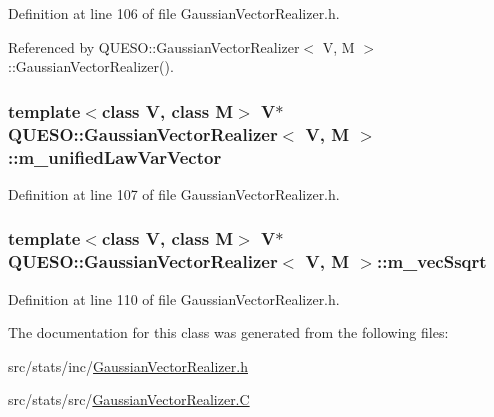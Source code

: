 Definition at line 106 of file Gaussian\-Vector\-Realizer.\-h.



Referenced by Q\-U\-E\-S\-O\-::\-Gaussian\-Vector\-Realizer$<$ V, M $>$\-::\-Gaussian\-Vector\-Realizer().

\hypertarget{class_q_u_e_s_o_1_1_gaussian_vector_realizer_a80276355d3e24953ed7be0749a554d85}{
\subsubsection[{m\-\_\-unified\-Law\-Var\-Vector}]{\setlength{\rightskip}{0pt plus 5cm}template$<$class V, class M$>$ V$\ast$ {\bf Q\-U\-E\-S\-O\-::\-Gaussian\-Vector\-Realizer}$<$ V, M $>$\-::m\-\_\-unified\-Law\-Var\-Vector\hspace{0.3cm}{\ttfamily [private]}}}\label{class_q_u_e_s_o_1_1_gaussian_vector_realizer_a80276355d3e24953ed7be0749a554d85}


Definition at line 107 of file Gaussian\-Vector\-Realizer.\-h.

\hypertarget{class_q_u_e_s_o_1_1_gaussian_vector_realizer_a473a7c1e61dd0b311bb7da6c244cb53d}{
\subsubsection[{m\-\_\-vec\-Ssqrt}]{\setlength{\rightskip}{0pt plus 5cm}template$<$class V, class M$>$ V$\ast$ {\bf Q\-U\-E\-S\-O\-::\-Gaussian\-Vector\-Realizer}$<$ V, M $>$\-::m\-\_\-vec\-Ssqrt\hspace{0.3cm}{\ttfamily [private]}}}\label{class_q_u_e_s_o_1_1_gaussian_vector_realizer_a473a7c1e61dd0b311bb7da6c244cb53d}


Definition at line 110 of file Gaussian\-Vector\-Realizer.\-h.



The documentation for this class was generated from the following files\-:\begin{DoxyCompactItemize}
\item 
src/stats/inc/\hyperlink{_gaussian_vector_realizer_8h}{Gaussian\-Vector\-Realizer.\-h}\item 
src/stats/src/\hyperlink{_gaussian_vector_realizer_8_c}{Gaussian\-Vector\-Realizer.\-C}\end{DoxyCompactItemize}
